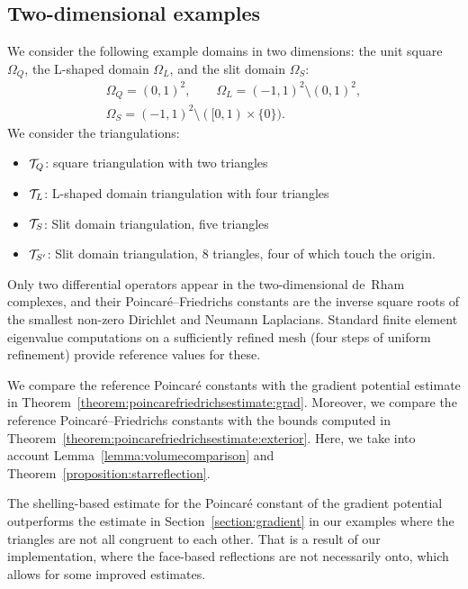 \documentclass[10pt,a4paper]{article}
\begin{document}
    



\subsection{Two-dimensional examples}

We consider the following example domains in two dimensions:
the unit square $\Omega_Q$, the L-shaped domain $\Omega_L$, and the slit domain $\Omega_{S}$:
\begin{gather*}
    \Omega_{Q} = ( 0,1)^2,
    \qquad 
    \Omega_{L} = (-1,1)^2 \setminus (0,1)^2,
    \\
    \Omega_{S} = (-1,1)^2 \setminus ( [0,1) \times \{0\} ).
\end{gather*}
We consider the triangulations: 
\begin{itemize}
    \item ${\mathcal T}_{Q}$:  square triangulation with two triangles
    \item ${\mathcal T}_{L}$:  L-shaped domain triangulation with four triangles
    \item ${\mathcal T}_{S}$:  Slit domain triangulation, five triangles 
    \item ${\mathcal T}_{S'}$: Slit domain triangulation, 8 triangles, four of which touch the origin.
\end{itemize}

Only two differential operators appear in the two-dimensional de~Rham complexes,
and their Poincar\'e--Friedrichs constants are the inverse square roots of the smallest non-zero Dirichlet and Neumann Laplacians. 
Standard finite element eigenvalue computations on a sufficiently refined mesh (four steps of uniform refinement) provide reference values for these.

We compare the reference Poincar\'e constants with the gradient potential estimate in Theorem~\ref{theorem:poincarefriedrichsestimate:grad}.
%
Moreover, we compare the reference Poincar\'e--Friedrichs constants with the bounds computed in Theorem~\ref{theorem:poincarefriedrichsestimate:exterior}. Here, we take into account Lemma~\ref{lemma:volumecomparison} and Theorem~\ref{proposition:starreflection}. 

The shelling-based estimate for the Poincar\'e constant of the gradient potential outperforms the estimate in Section~\ref{section:gradient} in our examples where the triangles are not all congruent to each other.
That is a result of our implementation, where the face-based reflections are not necessarily onto, which allows for some improved estimates.
\end{document}

